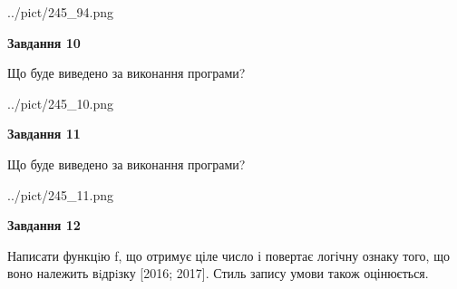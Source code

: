 \documentclass[12pt, ukrainian]{article}
\begin{document}
{\begin {large}
\begin{center}
	{../pict/245_94.png}
\end{center}
\newpage

{\begin {center}\textbf{Завдання 10}\end {center}}

Що буде виведено за виконання програми?\par
\begin{center}
	{../pict/245_10.png}
\end{center}
\newpage

{\begin {center}\textbf{Завдання 11}\end {center}}

Що буде виведено за виконання програми?\par
\begin{center}
	{../pict/245_11.png}
\end{center}
\newpage

{\begin {center}\textbf{Завдання 12}\end {center}}


Написати функцiю f, що отримує ціле число і повертає логічну ознаку того, що воно належить вiдрiзку [2016; 2017]. Стиль запису умови також оцінюється.\par
\newpage

\end {large}}
\end{document}

